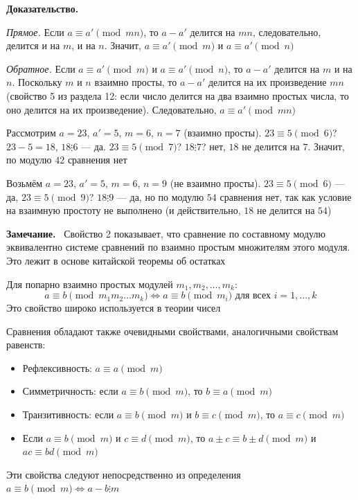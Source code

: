 \documentclass[a4paper,12pt]{article}
\newcommand{\myremark}{\textbf{Замечание.}\ }
\theoremstyle{definition}
\theoremstyle{plain}
\theoremstyle{remark}
\begin{document}
	\medskip
	\noindent \textbf{Доказательство.}
	
	\textit{Прямое.} Если $a \equiv a' \pmod{mn}$, то $a - a'$ делится на $mn$, следовательно, делится и на $m$, и на $n$. Значит, $a \equiv a' \pmod{m}$ и $a \equiv a' \pmod{n}$
	
	\textit{Обратное.} Если $a \equiv a' \pmod{m}$ и $a \equiv a' \pmod{n}$, то $a - a'$ делится на $m$ и на $n$. Поскольку $m$ и $n$ взаимно просты, то $a - a'$ делится на их произведение $mn$ (свойство 5 из раздела 12: если число делится на два взаимно простых числа, то оно делится на их произведение). Следовательно, $a \equiv a' \pmod{mn}$
	
	\begin{tcolorbox}[colback=blue!5, colframe=blue!40!black, title=Пример]
	Рассмотрим $a = 23$, $a' = 5$, $m = 6$, $n = 7$ (взаимно просты).
	$23 \equiv 5 \pmod{6}$? $23-5=18$, $18 \vdots 6$ — да.
	$23 \equiv 5 \pmod{7}$? $18 \vdots 7$? нет, $18$ не делится на $7$. Значит, по модулю $42$ сравнения нет
	
	Возьмём $a = 23$, $a' = 5$, $m = 6$, $n = 9$ (не взаимно просты).
	$23 \equiv 5 \pmod{6}$ — да, $23 \equiv 5 \pmod{9}$? $18 \vdots 9$ — да, но по модулю $54$ сравнения нет, так как условие на взаимную простоту не выполнено (и действительно, $18$ не делится на $54$)
	\end{tcolorbox}
	
	\myremark
	Свойство 2 показывает, что сравнение по составному модулю эквивалентно системе сравнений по взаимно простым множителям этого модуля. Это лежит в основе китайской теоремы об остатках
	
	\begin{tcolorbox}[colback=purple!5, colframe=purple!50!black, title=Заметочка: Обобщение]
	Для попарно взаимно простых модулей $m_1, m_2, \dots, m_k$:
	\[
	a \equiv b \pmod{m_1 m_2 \dots m_k} \iff a \equiv b \pmod{m_i} \text{ для всех } i = 1, \dots, k
	\]
	Это свойство широко используется в теории чисел
	\end{tcolorbox}
	
	\begin{tcolorbox}[colback=yellow!5, colframe=orange!60!black, title=Важное замечание]
	Сравнения обладают также очевидными свойствами, аналогичными свойствам равенств:
	\begin{itemize}
	\item Рефлексивность: $a \equiv a \pmod{m}$
	\item Симметричность: если $a \equiv b \pmod{m}$, то $b \equiv a \pmod{m}$
	\item Транзитивность: если $a \equiv b \pmod{m}$ и $b \equiv c \pmod{m}$, то $a \equiv c \pmod{m}$
	\item Если $a \equiv b \pmod{m}$ и $c \equiv d \pmod{m}$, то $a \pm c \equiv b \pm d \pmod{m}$ и $ac \equiv bd \pmod{m}$
	\end{itemize}
	Эти свойства следуют непосредственно из определения $a \equiv b \pmod{m} \iff a-b \vdots m$
	\end{tcolorbox}
	
\end{document}
